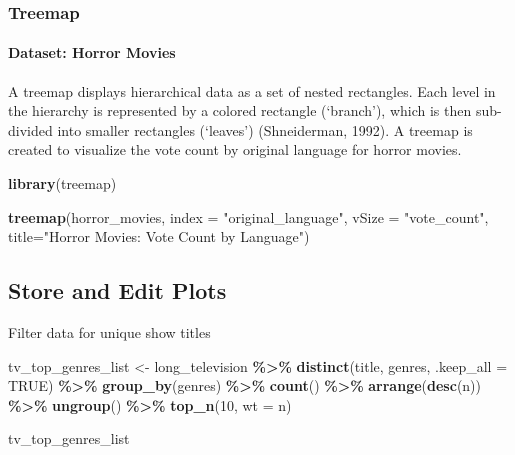 \documentclass[
]{book}
\newenvironment{Shaded}{\begin{snugshade}}{\end{snugshade}}
\newcommand{\AttributeTok}[1]{\textcolor[rgb]{0.13,0.29,0.53}{#1}}
\newcommand{\ConstantTok}[1]{\textcolor[rgb]{0.56,0.35,0.01}{#1}}
\newcommand{\DecValTok}[1]{\textcolor[rgb]{0.00,0.00,0.81}{#1}}
\newcommand{\FunctionTok}[1]{\textcolor[rgb]{0.13,0.29,0.53}{\textbf{#1}}}
\newcommand{\NormalTok}[1]{#1}
\newcommand{\OtherTok}[1]{\textcolor[rgb]{0.56,0.35,0.01}{#1}}
\newcommand{\SpecialCharTok}[1]{\textcolor[rgb]{0.81,0.36,0.00}{\textbf{#1}}}
\newcommand{\StringTok}[1]{\textcolor[rgb]{0.31,0.60,0.02}{#1}}
\begin{document}
\hypertarget{treemap}{%
\subsubsection*{Treemap}\label{treemap}}

\hypertarget{dataset-horror-movies}{%
\paragraph*{Dataset: Horror Movies}\label{dataset-horror-movies}}

A treemap displays hierarchical data as a set of nested rectangles. Each level in the hierarchy is represented by a colored rectangle (`branch'), which is then sub-divided into smaller rectangles (`leaves') (Shneiderman, 1992). A treemap is created to visualize the vote count by original language for horror movies.

\begin{Shaded}
\begin{Highlighting}[]
\FunctionTok{library}\NormalTok{(treemap)}

\FunctionTok{treemap}\NormalTok{(horror\_movies, }
        \AttributeTok{index =} \StringTok{"original\_language"}\NormalTok{, }
        \AttributeTok{vSize =} \StringTok{"vote\_count"}\NormalTok{, }
        \AttributeTok{title=}\StringTok{"Horror Movies: Vote Count by Language"}\NormalTok{)}
\end{Highlighting}
\end{Shaded}

\hypertarget{store-and-edit-plots}{%
\subsection*{Store and Edit Plots}\label{store-and-edit-plots}}

Filter data for unique show titles

\begin{Shaded}
\begin{Highlighting}[]
\NormalTok{tv\_top\_genres\_list }\OtherTok{\textless{}{-}}\NormalTok{ long\_television }\SpecialCharTok{\%\textgreater{}\%}
  \FunctionTok{distinct}\NormalTok{(title, genres, }\AttributeTok{.keep\_all =} \ConstantTok{TRUE}\NormalTok{) }\SpecialCharTok{\%\textgreater{}\%}
  \FunctionTok{group\_by}\NormalTok{(genres) }\SpecialCharTok{\%\textgreater{}\%}
  \FunctionTok{count}\NormalTok{() }\SpecialCharTok{\%\textgreater{}\%}
  \FunctionTok{arrange}\NormalTok{(}\FunctionTok{desc}\NormalTok{(n)) }\SpecialCharTok{\%\textgreater{}\%}
  \FunctionTok{ungroup}\NormalTok{() }\SpecialCharTok{\%\textgreater{}\%}
  \FunctionTok{top\_n}\NormalTok{(}\DecValTok{10}\NormalTok{, }\AttributeTok{wt =}\NormalTok{ n)}

\NormalTok{tv\_top\_genres\_list}
\end{Highlighting}
\end{Shaded}
\end{document}
